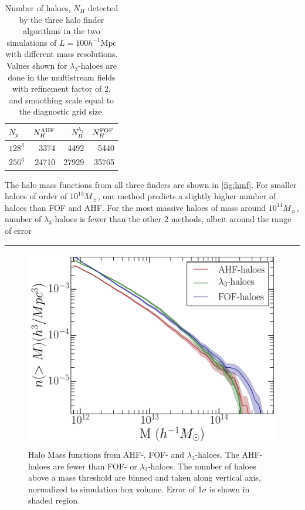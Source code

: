 \documentclass[fleqn,usenatbib,useAMS]{mnras}
\newcommand\hl{\bgroup\markoverwith
  {\textcolor{yellow}{\rule[-.5ex]{2pt}{2.5ex}}}\ULon}
\newcommand\ghl{\bgroup\markoverwith
  {\textcolor{green}{\rule[-.5ex]{2pt}{2.5ex}}}\ULon}
\begin{document}
\begin{table}
  \caption{Number of haloes, $N_H$ detected by the three halo finder algorithms in the two simulations of $L = 100 h^{-1} \text{Mpc}$ with different mass resolutions. Values shown for $\lambda_3$-haloes are done in the multistream fields with refinement factor of 2, and smoothing scale equal to the diagnostic grid size.}
\begin{tabular}{|l|r|r|r|}
\hline
$N_p$  &  $N_H^{\rm AHF}$ & $N_H^{\lambda_3}$ &  $N_H^{\rm FOF}$  \\ \hline
$128^3$   & 3374  & 4492 &  5440  \\ \hline
$256^3$   & 24710  & 27929 & 35765  \\ \hline

\end{tabular}
\label{tab:HaloFinderMF}
\end{table}



The halo mass functions from all three finders are shown in \autoref{fig:hmf}. For smaller haloes of order of $10^{13} M_{\sun}$, our method predicts a slightly higher number of haloes than FOF and AHF. For the most massive haloes of mass around $10^{14} M_{\sun}$, number of $\lambda_3$-haloes is fewer than the other 2 methods, albeit around the range of error \hl{of AHF-haloes.}  %


\begin{figure}
\begin{minipage}[t]{.99\linewidth}
 \centering\includegraphics[width=8.cm]{fig10.pdf} 
\end{minipage}\hfill
\caption{Halo Mass functions from AHF-, FOF- and $\lambda_3$-haloes. The AHF-haloes are fewer than FOF- or $\lambda_3$-haloes. The number of haloes above a mass threshold are binned and taken along vertical axis, normalized to simulation box volume. Error of 1$\sigma$ is shown in shaded region. }
\label{fig:hmf}
\end{figure}
\end{document}
